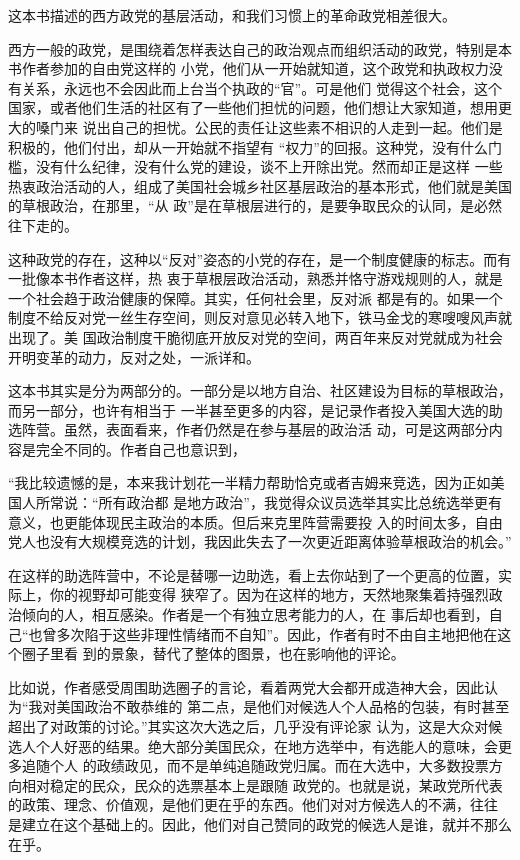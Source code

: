 ﻿\documentclass[11pt]{article}
\begin{document}
这本书描述的西方政党的基层活动，和我们习惯上的革命政党相差很大。

西方一般的政党，是围绕着怎样表达自己的政治观点而组织活动的政党，特别是本书作者参加的自由党这样的
小党，他们从一开始就知道，这个政党和执政权力没有关系，永远也不会因此而上台当个执政的``官''。可是他们
觉得这个社会，这个国家，或者他们生活的社区有了一些他们担忧的问题，他们想让大家知道，想用更大的嗓门来
说出自己的担忧。公民的责任让这些素不相识的人走到一起。他们是积极的，他们付出，却从一开始就不指望有
``权力''的回报。这种党，没有什么门槛，没有什么纪律，没有什么党的建设，谈不上开除出党。然而却正是这样
一些热衷政治活动的人，组成了美国社会城乡社区基层政治的基本形式，他们就是美国的草根政治，在那里，``从
政''是在草根层进行的，是要争取民众的认同，是必然往下走的。

这种政党的存在，这种以``反对''姿态的小党的存在，是一个制度健康的标志。而有一批像本书作者这样，热
衷于草根层政治活动，熟悉并恪守游戏规则的人，就是一个社会趋于政治健康的保障。其实，任何社会里，反对派
都是有的。如果一个制度不给反对党一丝生存空间，则反对意见必转入地下，铁马金戈的寒嗖嗖风声就出现了。美
国政治制度干脆彻底开放反对党的空间，两百年来反对党就成为社会开明变革的动力，反对之处，一派详和。

这本书其实是分为两部分的。一部分是以地方自治、社区建设为目标的草根政治，而另一部分，也许有相当于
一半甚至更多的内容，是记录作者投入美国大选的助选阵营。虽然，表面看来，作者仍然是在参与基层的政治活
动，可是这两部分内容是完全不同的。作者自己也意识到，

``我比较遗憾的是，本来我计划花一半精力帮助恰克或者吉姆来竞选，因为正如美国人所常说：``所有政治都
是地方政治''，我觉得众议员选举其实比总统选举更有意义，也更能体现民主政治的本质。但后来克里阵营需要投
入的时间太多，自由党人也没有大规模竞选的计划，我因此失去了一次更近距离体验草根政治的机会。''

在这样的助选阵营中，不论是替哪一边助选，看上去你站到了一个更高的位置，实际上，你的视野却可能变得
狭窄了。因为在这样的地方，天然地聚集着持强烈政治倾向的人，相互感染。作者是一个有独立思考能力的人，在
事后却也看到，自己``也曾多次陷于这些非理性情绪而不自知''。因此，作者有时不由自主地把他在这个圈子里看
到的景象，替代了整体的图景，也在影响他的评论。

比如说，作者感受周围助选圈子的言论，看着两党大会都开成造神大会，因此认为``我对美国政治不敢恭维的
第二点，是他们对候选人个人品格的包装，有时甚至超出了对政策的讨论。''其实这次大选之后，几乎没有评论家
认为，这是大众对候选人个人好恶的结果。绝大部分美国民众，在地方选举中，有选能人的意味，会更多追随个人
的政绩政见，而不是单纯追随政党归属。而在大选中，大多数投票方向相对稳定的民众，民众的选票基本上是跟随
政党的。也就是说，某政党所代表的政策、理念、价值观，是他们更在乎的东西。他们对对方候选人的不满，往往
是建立在这个基础上的。因此，他们对自己赞同的政党的候选人是谁，就并不那么在乎。
\end{document}
